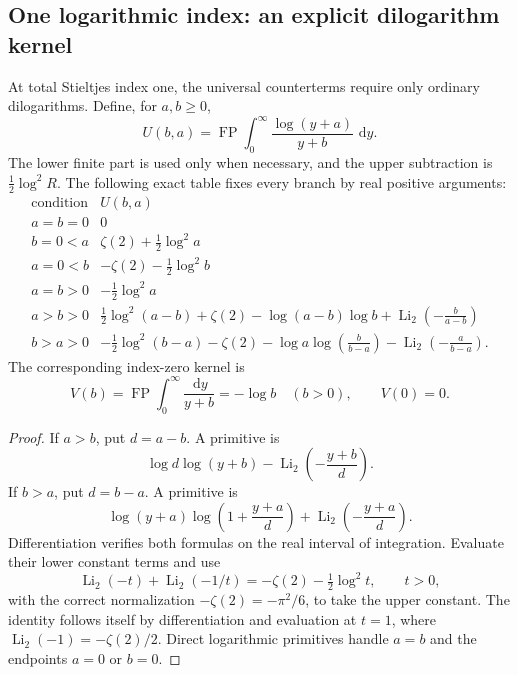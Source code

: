 \documentclass[11pt]{article}
\numberwithin{equation}{section}
\theoremstyle{plain}
\theoremstyle{definition}
\theoremstyle{remark}
\DeclareMathOperator{\Li}{Li}
\DeclareMathOperator{\FP}{FP}
\newcommand{\dd}{\,\mathrm d}
\begin{document}


\subsection{One logarithmic index: an explicit dilogarithm kernel}
\label{gcx:one-log}

At total Stieltjes index one, the universal counterterms require only
ordinary dilogarithms.  Define, for $a,b\ge0$,
\[
 U(b,a)=\FP\int_0^\infty\frac{\log(y+a)}{y+b}\,\dd y.
\]
The lower finite part is used only when necessary, and the upper
subtraction is $\tfrac12\log^2R$.  The following exact table fixes every
branch by real positive arguments:
\begin{equation}\label{gcx:U-table}
\begin{array}{c|l}
 \text{condition}& U(b,a)\\ \hline
 a=b=0&0\\[2pt]
 b=0<a&\zeta(2)+\tfrac12\log^2a\\[2pt]
 a=0<b&-\zeta(2)-\tfrac12\log^2b\\[2pt]
 a=b>0&-\tfrac12\log^2a\\[2pt]
 a>b>0&\tfrac12\log^2(a-b)+\zeta(2)
       -\log(a-b)\log b+\Li_2\!\left(-\frac b{a-b}\right)\\[2pt]
 b>a>0&-\tfrac12\log^2(b-a)-\zeta(2)
       -\log a\log\!\left(\frac b{b-a}\right)
       -\Li_2\!\left(-\frac a{b-a}\right).
\end{array}
\end{equation}
The corresponding index-zero kernel is
\[
 V(b)=\FP\int_0^\infty\frac{\dd y}{y+b}
       =-\log b\quad(b>0),\qquad V(0)=0.
\]

\begin{proof}
If $a>b$, put $d=a-b$.  A primitive is
\[
 \log d\log(y+b)-\Li_2\!\left(-\frac{y+b}{d}\right).
\]
If $b>a$, put $d=b-a$.  A primitive is
\[
 \log(y+a)\log\!\left(1+\frac{y+a}{d}\right)
       +\Li_2\!\left(-\frac{y+a}{d}\right).
\]
Differentiation verifies both formulas on the real interval of
integration.  Evaluate their lower constant terms and use
\[
 \Li_2(-t)+\Li_2(-1/t)=-\zeta(2)-\tfrac12\log^2t,
 \qquad t>0,
\]
with the correct normalization $-\zeta(2)=-\pi^2/6$, to take the upper
constant.  The identity follows itself by differentiation and evaluation
at $t=1$, where $\Li_2(-1)=-\zeta(2)/2$.  Direct logarithmic primitives
handle $a=b$ and the endpoints $a=0$ or $b=0$.
\end{proof}
\end{document}
